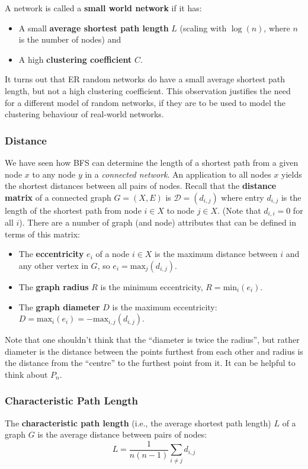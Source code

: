 \documentclass[a4paper,11pt]{article}
\begin{document}
A network is called a \textbf{small world network} if it has:
\begin{itemize}
    \item   A small \textbf{average shortest path length} $L$ (scaling with $\log(n)$, where $n$ is the number of nodes) and
    \item   A high \textbf{clustering coefficient} $C$.
\end{itemize}

It turns out that ER random networks do have a small average shortest path length, but not a high clustering coefficient.
This observation justifies the need for a different model of random networks, if they are to be used to model the clustering behaviour of real-world networks.

\subsubsection{Distance}
We have seen how BFS can determine the length of a shortest path from a given node $x$ to any node $y$ in a \textit{connected network}.
An application to all nodes $x$ yields the shortest distances between all pairs of nodes.
Recall that the \textbf{distance matrix} of a connected graph $G = (X,E)$ is $\mathcal{D} = (d_{i,j})$ where entry $d_{i,j}$ is the length of the shortest path from node $i \in X$ to node $j \in X$.
(Note that $d_{i,i} = 0$ for all $i$).
There are a number of graph (and node) attributes that can be defined in terms of this matrix:
\begin{itemize}
    \item   The \textbf{eccentricity} $e_i$ of a node $i \in X$ is the maximum distance between $i$ and any other vertex in $G$, so $e_i = \text{max}_j(d_{i,j})$.
    \item   The \textbf{graph radius} $R$ is the minimum eccentricity, $R = \text{min}_i(e_i)$.
    \item   The \textbf{graph diameter} $D$ is the maximum eccentricity: $D = \text{max}_i(e_i) = - \text{max}_{i,j} (d_{i,j})$.
\end{itemize}

Note that one shouldn't think that the ``diameter is twice the radius'', but rather diameter is the distance between the points furthest from each other and radius is the distance from the ``centre'' to the furthest point from it.
It can be helpful to think about $P_n$.

\subsubsection{Characteristic Path Length}
The \textbf{characteristic path length} (i.e., the average shortest path length) $L$ of a graph $G$ is the average distance between pairs of nodes:
\[
    L = \frac{1}{n(n-1)} \sum_{i \neq j} d_{i,j}
\]
\end{document}
